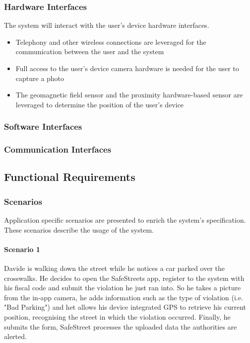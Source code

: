 \clearpage

\subsubsection{Hardware Interfaces}

The system will interact with the user's device hardware interfaces.	
	\begin{itemize} 
		\item Telephony and other wireless connections are leveraged for the communication between the user and the system
		\item Full access to the user's device camera hardware is needed for the user to capture a photo
		\item The geomagnetic field sensor and the proximity hardware-based sensor are leveraged to determine the position of the user's device
	\end{itemize}
	
\subsubsection{Software Interfaces}
\subsubsection{Communication Interfaces}

\clearpage

\subsection{Functional Requirements}

\subsubsection{Scenarios}

Application specific scenarios are presented to enrich the system's specification. These scenarios describe the usage of the system.

\paragraph{Scenario 1}
\label{scenario:1}
	Davide is walking down the street while he notices a car parked over the crosswalks. He decides to open the SafeStreets app, register to the system with his fiscal code and submit the violation he just ran into. So he takes a picture from the in-app camera, he adds information such as the type of violation (i.e. "Bad Parking") and het allows his device integrated GPS to retrieve his current position, recognising the street in which the violation occurred. Finally, he submits the form, SafeStreet processes the uploaded data the authorities are alerted.

